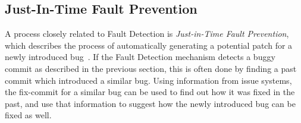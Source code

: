 
\subsection{Just-In-Time Fault Prevention}
\label{sec:faultprevention}

A process closely related to Fault Detection is \textit{Just-in-Time Fault Prevention}, which describes the process of automatically generating a potential patch for a newly introduced bug~\cite{Nayrolles2018}. If the Fault Detection mechanism detects a buggy commit as described in the previous section, this is often done by finding a past commit which introduced a similar bug. Using information from issue systems, the fix-commit for a similar bug can be used to find out how it was fixed in the past, and use that information to suggest how the newly introduced bug can be fixed as well.

